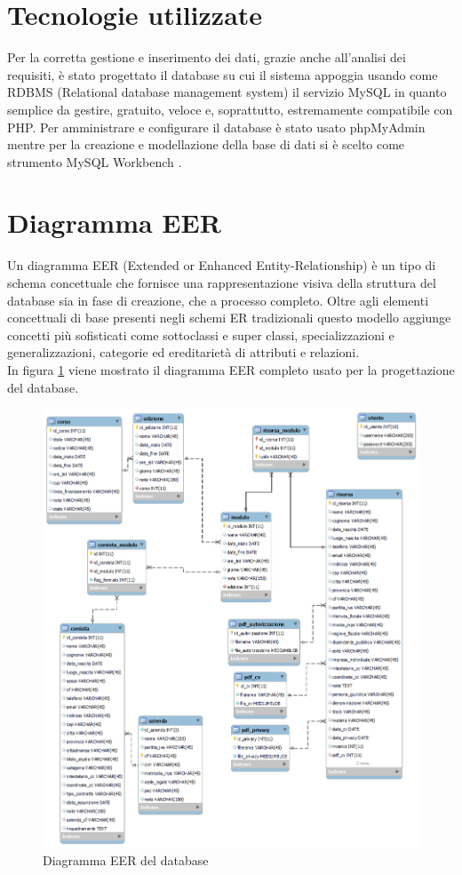 \section{Tecnologie utilizzate}
\label{sec:dbtech}
Per la corretta gestione e inserimento dei dati, grazie anche all'analisi dei requisiti, è stato progettato il database su cui il sistema appoggia usando come RDBMS (Relational database management system) il servizio MySQL \cite{mysql} in quanto semplice da gestire, gratuito, veloce e, soprattutto, estremamente compatibile con PHP. Per amministrare e configurare il database è stato usato phpMyAdmin \cite{phpmyadmin} mentre per la creazione e modellazione della base di dati si è scelto come strumento MySQL Workbench \cite{mysqlworkbench}.

\section{Diagramma EER}
\label{sec:db}
Un diagramma EER (Extended or Enhanced Entity-Relationship) \cite{eer} è un tipo di schema concettuale che fornisce una rappresentazione visiva della struttura del database sia in fase di creazione, che a processo completo. Oltre agli elementi concettuali di base presenti negli schemi ER tradizionali questo modello aggiunge concetti più sofisticati come sottoclassi e super classi, specializzazioni e generalizzazioni, categorie ed ereditarietà di attributi e relazioni. \\
\newline
In figura \ref{fig:DiagrammaEER} viene mostrato il diagramma EER completo usato per la progettazione del database.
\begin{figure}[!hbt]
\centering
\includegraphics[scale=0.50]{img/EER.png}
\caption{Diagramma EER del database}
\label{fig:DiagrammaEER}
\end{figure}

